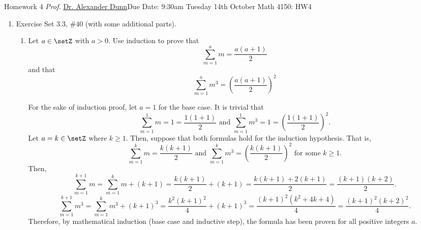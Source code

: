


\newpage{}
{Homework 4}
{\textit{Prof.} \href{https://alexjdunn.weebly.com/}{Dr. Alexander Dunn}}{Due Date: 9:30am Tuesday 14th October}
{Math 4150: HW4}


\newpage





\begin{enumerate}
  \item Exercise Set 3.3, \#40 (with some additional parts).
  \begin{enumerate}
    \item Let $a \in \setZ$ with $a>0$. Use induction to prove that
    $$
    \sum_{m=1}^a m=\frac{a(a+1)}{2}
    $$
    and that
    $$
    \sum_{m=1}^a m^3=\left(\frac{a(a+1)}{2}\right)^2
    $$
    \label{prob:3.3.40-a}
    \begin{subprove}
      For the sake of induction proof, let $a=1$ for the base case.
      It is trivial that
      \[
      \sum_{m=1}^1 m = 1 = \frac{1(1+1)}{2} \text{ and } \sum_{m=1}^1 m^3 = 1 = \left(\frac{1(1+1)}{2}\right)^2.
      \]
      Let $a=k\in\setZ$ where $k \geq 1$. Then, suppose that both formulas hold for the induction hypothesis.
      That is,
      \[
      \sum_{m=1}^k m = \frac{k(k+1)}{2} \text{ and } \sum_{m=1}^k m^3 = \left(\frac{k(k+1)}{2}\right)^2 \text{ for some } k \geq 1.
      \]
      Then, 
      \[
      \sum_{m=1}^{k+1} m = \sum_{m=1}^k m + (k+1) = \frac{k(k+1)}{2} + (k+1) = \frac{k(k+1) + 2(k+1)}{2} = \frac{(k+1)(k+2)}{2}.
      \]
      \[
      \sum_{m=1}^{k+1} m^3 = \sum_{m=1}^k m^3 + (k+1)^3 = \frac{k^2(k+1)^2}{4} + (k+1)^3 = \frac{(k+1)^2(k^2 + 4k+4)}{4} = \frac{(k+1)^2(k+2)^2}{4}.
      \]
      Therefore, by mathematical induction (base case and inductive step), the formula has been proven for all positive integers $a$.
    \end{subprove}

    \newpage


\end{enumerate}
\end{enumerate}
